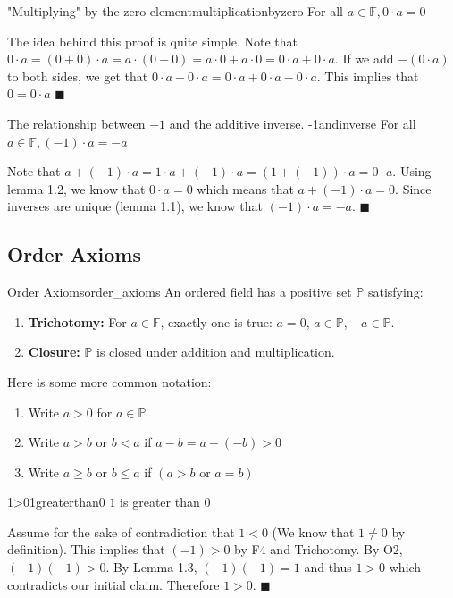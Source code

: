 \documentclass[11pt, letterpaper, openany]{book}
\renewenvironment{proof}[1][\proofname]{%
  \tcolorbox[blanker, breakable, left=1em,
    before skip=1em, after skip=1em,
    borderline west={2pt}{0pt}{MagicTeal!50},
    colback=MagicCream,
    before upper={\textcolor{MagicTeal}{\sffamily\bfseries #1.}\space}
  ]%
}{%
  \hfill\textcolor{MagicTeal}{\ensuremath{\blacksquare}}\endtcolorbox%
}
\begin{document}
\begin{lem}{"Multiplying" by the zero element}{multiplicationbyzero}
    For all $a\in{\mathbb{F}}, 0\cdot{a}=0$
\end{lem}
\begin{proof}
    The idea behind this proof is quite simple. Note that $0\cdot{a}=(0+0)\cdot{a}=a\cdot(0+0)=a\cdot0+a\cdot0=0\cdot{a}+0\cdot{a}$. If we add $-(0\cdot{a})$ to both sides, we get that $0\cdot{a}-0\cdot{a}=0\cdot{a}+0\cdot{a}-0\cdot{a}$. This implies that $0=0\cdot{a}$
\end{proof}
\begin{lem}{The relationship between $-1$ and the additive inverse. }{-1andinverse}
    For all $a\in{\mathbb{F}}, (-1)\cdot{a}=-a$
\end{lem}
\begin{proof}
    Note that $a+(-1)\cdot{a}=1\cdot{a}+(-1)\cdot{a}=(1+(-1))\cdot{a}=0\cdot{a}$. Using lemma 1.2, we know that $0\cdot{a}=0$ which means that $a+(-1)\cdot{a}=0$. Since inverses are unique (lemma 1.1), we know that $(-1)\cdot{a}=-a$. 
\end{proof}

\subsection{Order Axioms}
\begin{defn}{Order Axioms}{order_axioms}
An ordered field has a positive set $\mathbb{P}$ satisfying:
\begin{enumerate}
    \item \textbf{Trichotomy:} For $a \in \mathbb{F}$, exactly one is true: $a=0$, $a \in \mathbb{P}$, $-a \in \mathbb{P}$.
    \item \textbf{Closure:} $\mathbb{P}$ is closed under addition and multiplication.
\end{enumerate}
\end{defn}
\begin{remark}
    Here is some more common notation: 
    \begin{enumerate}
        \item Write $a>0$ for $a\in\mathbb{P}$
        \item Write $a>b$ or $b<a$ if $a-b=a+(-b)>0$
        \item Write $a\geq{b}$ or $b\leq{a}$ if $(a>b\text{ or }a=b)$
    \end{enumerate}
\end{remark}
\begin{lem}{1>0}{1greaterthan0}
    $1$ is greater than $0$
\end{lem}
\begin{proof}
    Assume for the sake of contradiction that $1<0$ (We know that $1\neq0$ by definition). This implies that $(-1)>0$ by F4 and Trichotomy. By O2, $(-1)(-1)>0$. By Lemma 1.3, $(-1)(-1)=1$ and thus $1>0$ which contradicts our initial claim. Therefore $1>0$. 
\end{proof}
\end{document}
